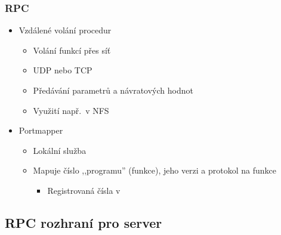 \begin{frame}
  \frametitle{RPC}

  \begin{itemize}
    \item Vzdálené volání procedur
    \begin{itemize}
      \item Volání funkcí přes síť
      \item UDP nebo TCP
      \item Předávání parametrů a návratových hodnot
      \item Využití např.\ v NFS
    \end{itemize}

    \pause

    \item Portmapper
    \begin{itemize}
      \item Lokální služba
      \item Mapuje číslo ,,programu'' (funkce), jeho verzi a protokol na funkce
      \begin{itemize}
        \item Registrovaná čísla v 
      \end{itemize}
    \end{itemize}
  \end{itemize}

\end{frame}

\subsection{RPC rozhraní pro server}

